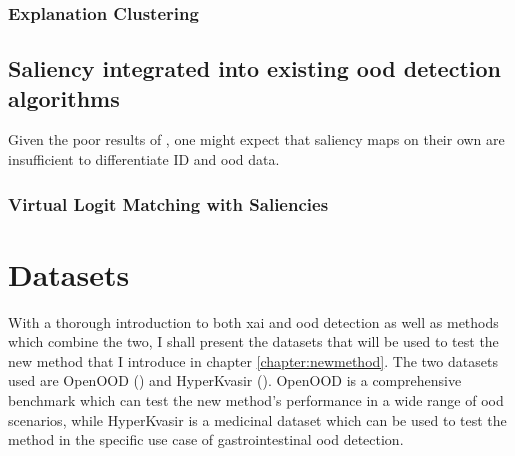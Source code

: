 \documentclass[UKenglish]{uiomasterthesis} %
\theoremstyle{definition}
\begin{document}
%
%
%
%




\subsubsection{Explanation Clustering}


\subsection{Saliency integrated into existing \ac{ood} detection algorithms}

Given the poor results of \cite{martinez}, one might expect that saliency maps on their own are insufficient to differentiate ID and \ac{ood} data.

\subsubsection{Virtual Logit Matching with Saliencies}


\section{Datasets} \label{section:datasets}

With a thorough introduction to both \ac{xai} and \ac{ood} detection as well as methods which combine the two, I shall present the datasets that will be used to test the new method that I introduce in chapter \ref{chapter:newmethod}. The two datasets used are OpenOOD (\cite{openood}) and HyperKvasir (\cite{hyperkvasir}). OpenOOD is a comprehensive benchmark which can test the new method's performance in a wide range of \ac{ood} scenarios, while HyperKvasir is a medicinal dataset which can be used to test the method in the specific use case of gastrointestinal \ac{ood} detection.
\end{document}
